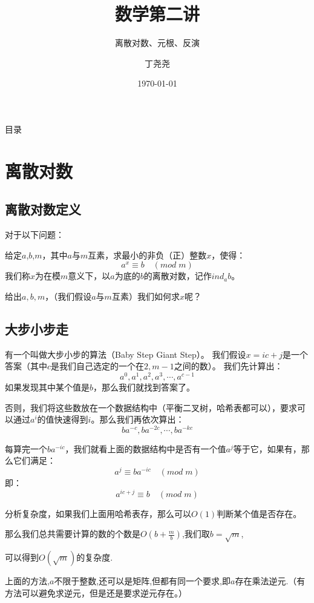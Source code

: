 \documentclass[9pt]{beamer}
\title{数学第二讲}
\subtitle{离散对数、元根、反演}
\author{丁尧尧}
\institute{上海交通大学}
\date{\today}
\begin{document}
	\maketitle
	\begin{frame}{目录}
		\tableofcontents
	\end{frame}
	
	\section{离散对数}
		\subsection{离散对数定义}
		\begin{frame}
			对于以下问题：
			\begin{definition}[离散对数]
				给定$a$,$b$,$m$，其中$a$与$m$互素，求最小的非负（正）整数$x$，使得：
				$$
				a^x \equiv b \quad (mod \; m)
				$$
				我们称$x$为在模$m$意义下，以$a$为底的$b$的离散对数，记作$ind_ab$。
			\end{definition}
			
			\pause
			
			给出$a,b,m$，（我们假设$a$与$m$互素）我们如何求$x$呢？
		\end{frame}
		\subsection{大步小步走}
		\begin{frame}
			有一个叫做大步小步的算法（Baby Step Giant Step）。
			我们假设$x = ic + j$是一个答案（其中$c$是我们自己选定的一个在$2,m-1$之间的数）。
			我们先计算出：
			$$
			a^0, a^1, a^2, a^3, \cdots, a^{c-1}
			$$			
			如果发现其中某个值是$b$，那么我们就找到答案了。
			
									\pause
									
			否则，我们将这些数放在一个数据结构中（平衡二叉树，哈希表都可以），要求可以通过$a^i$的值快速得到$i$。那么我们再依次算出：
			$$
			ba^{-c}, ba^{-2c}, \cdots, ba^{-kc}
			$$
			
						\pause
			
			每算完一个$ba^{-ic}$，我们就看上面的数据结构中是否有一个值$a^j$等于它，如果有，那么它们满足：
			$$
			a^j \equiv ba^{-ic} \quad (mod \; m)
			$$
			即：
			$$
			a^{ic + j} \equiv b \quad (mod \; m)
			$$
		\end{frame}
		\begin{frame}
			分析复杂度，如果我们上面用哈希表存，那么可以$O(1)$判断某个值是否存在。
			
			那么我们总共需要计算的数的个数是$O(b + \frac{m}{b})$,我们取$b = \sqrt{m}$,
			
			可以得到$O(\sqrt{m})$的复杂度.
			
						\pause
			
			上面的方法,$a$不限于整数,还可以是矩阵,但都有同一个要求,即$a$存在乘法逆元.（有方法可以避免求逆元，但是还是要求逆元存在。）
		\end{frame}
\end{document}
